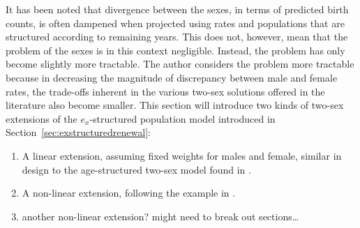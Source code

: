  \FloatBarrier
{}

It has been noted that divergence between the sexes, in terms of predicted birth
counts, is often dampened when projected using rates and populations that are
structured according to remaining years. This does not, however, mean that the
problem of the sexes is in this context negligible. Instead, the problem has
only become slightly more tractable. The author considers the problem more
tractable because in decreasing the magnitude of discrepancy between male and female
rates, the trade-offs inherent in the various two-sex solutions offered in the
literature also become smaller. This section will introduce two kinds of two-sex
extensions of the $e_x$-structured population model introduced in
Section~\ref{sec:exstructuredrenewal}:
\begin{enumerate}
  \item A linear extension, assuming fixed weights for males and female,
  similar in design to the age-structured two-sex model found in
  \citet{goodman1967age}.
  \item A non-linear extension, following the example in
  \citet{gupta1978alternative}.
  \item another non-linear extension? might need to break out sections\ldots
\end{enumerate}